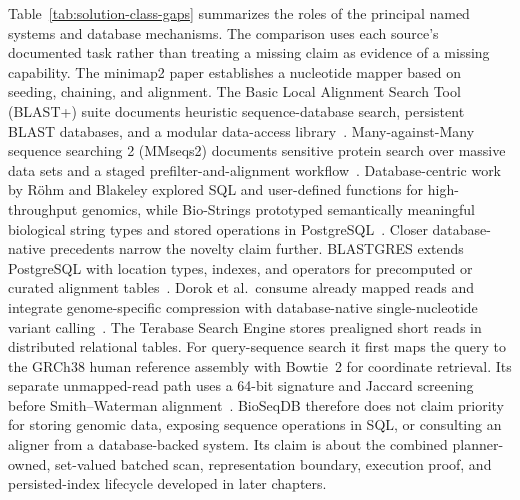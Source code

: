 Table~\ref{tab:solution-class-gaps} summarizes the roles of the principal
named systems and database mechanisms.  The comparison uses each source's
documented task rather than treating a missing claim as evidence of a missing
capability.  The minimap2 paper establishes a nucleotide
mapper based on seeding, chaining, and alignment.  The Basic Local Alignment
Search Tool (BLAST+) suite documents heuristic sequence-database
search, persistent BLAST databases, and a modular data-access
library~\cite{blast_plus_2009}.  Many-against-Many sequence searching 2
(MMseqs2) documents
sensitive protein search over massive data sets and a staged
prefilter-and-alignment workflow~\cite{mmseqs2_2017}.
Database-centric work by R\"ohm and Blakeley explored SQL and user-defined
functions for high-throughput genomics, while Bio-Strings prototyped
semantically meaningful biological string types and stored operations in
PostgreSQL~\cite{roehm_blakeley_genomics_2009,bio_strings_2022}.
Closer database-native precedents narrow the novelty claim further.
BLASTGRES extends PostgreSQL with location types, indexes, and operators for
precomputed or curated alignment tables~\cite{parker_alignment_tables_2008}.
Dorok et al.\ consume already mapped reads and integrate genome-specific
compression with database-native single-nucleotide variant
calling~\cite{dorok_genome_databases_2017}.
The Terabase Search Engine stores prealigned short reads in distributed
relational tables. For query-sequence search it first maps the query to the
GRCh38 human reference assembly with Bowtie~2 for coordinate retrieval. Its
separate unmapped-read path uses a
64-bit signature and Jaccard screening before Smith--Waterman
alignment~\cite{wilton_terabase_2019}. BioSeqDB therefore does not
claim priority for storing genomic data, exposing sequence operations in SQL,
or consulting an aligner from a database-backed system. Its claim is about the
combined planner-owned, set-valued batched scan, representation boundary,
execution proof, and persisted-index lifecycle developed in later chapters.

